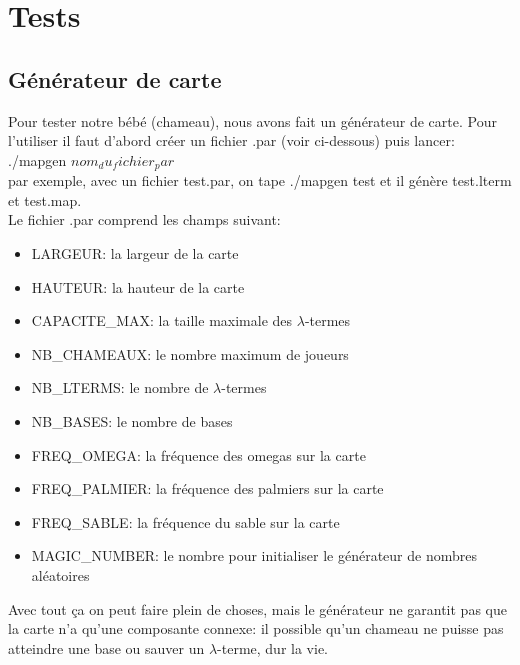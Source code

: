 \documentclass[a4paper,12pt]{article}
\begin{document}
\section{Tests}
\subsection{G\'en\'erateur de carte}
Pour tester notre b\'eb\'e (chameau), nous avons fait un g\'en\'erateur de carte. Pour l'utiliser il faut d'abord cr\'eer un fichier .par (voir ci-dessous) puis lancer:\\
./mapgen $nom_du_fichier_par$\\
par exemple, avec un fichier test.par, on tape ./mapgen test et il g\'en\`ere test.lterm et test.map.\\
Le fichier .par comprend les champs suivant:\\
\begin{itemize}
\item LARGEUR: la largeur de la carte
\item HAUTEUR: la hauteur de la carte
\item CAPACITE\_MAX: la taille maximale des $\lambda$-termes
\item NB\_CHAMEAUX: le nombre maximum de joueurs
\item NB\_LTERMS: le nombre de $\lambda$-termes
\item NB\_BASES: le nombre de bases
\item FREQ\_OMEGA: la fr\'equence des omegas sur la carte
\item FREQ\_PALMIER: la fr\'equence des palmiers sur la carte
\item FREQ\_SABLE: la fr\'equence du sable sur la carte
\item MAGIC\_NUMBER: le nombre pour initialiser le g\'en\'erateur de nombres al\'eatoires
\end{itemize}
Avec tout \c ca on peut faire plein de choses, mais le g\'en\'erateur ne garantit pas que la carte n'a qu'une composante connexe: il possible qu'un chameau ne puisse pas atteindre une base ou sauver un $\lambda$-terme, dur la vie.
\end{document}
